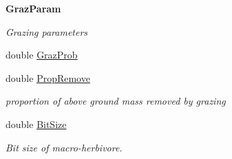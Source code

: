 \begin{Indent}\textbf{ Graz\+Param}\par
{\em Grazing parameters }\begin{DoxyCompactItemize}
\item 
double \mbox{\hyperlink{struct_s_run_para_acb13e5adf214fe475adadcdf188f7edf}{Graz\+Prob}}
\item 
\mbox{\label{struct_s_run_para_a8a375f190fcd09bbe28973dc2505c830}} 
double \mbox{\hyperlink{struct_s_run_para_a8a375f190fcd09bbe28973dc2505c830}{Prop\+Remove}}
\begin{DoxyCompactList}\small\item\em proportion of above ground mass removed by grazing \end{DoxyCompactList}\item 
\mbox{\label{struct_s_run_para_a18028f4c3dc8a81ad5e06d7203f771e2}} 
double \mbox{\hyperlink{struct_s_run_para_a18028f4c3dc8a81ad5e06d7203f771e2}{Bit\+Size}}
\begin{DoxyCompactList}\small\item\em Bit size of macro-\/herbivore. \end{DoxyCompactList}\end{DoxyCompactItemize}
\end{Indent}
